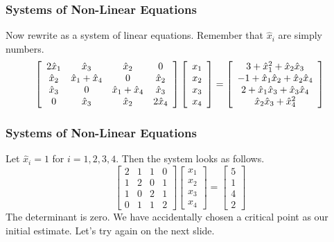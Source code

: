 \documentclass[xcolor=dvipsnames]{beamer}
\begin{document}
\begin{frame}
  \frametitle{Systems of Non-Linear Equations}
  Now rewrite as a system of linear equations. Remember that
  $\hat{x}_{i}$ are simply numbers.
  \begin{equation}
    \label{eq:heawaiqu}
    \left[
      \begin{array}{cccc}
2\hat{x}_{1} & \hat{x}_{3}       & \hat{x}_{2}       & 0     \\
\hat{x}_{2}  & \hat{x}_{1}+\hat{x}_{4} & 0           & \hat{x}_{2} \\
\hat{x}_{3}  & 0           & \hat{x}_{1}+\hat{x}_{4} & \hat{x}_{3} \\
0      & \hat{x}_{3}       & \hat{x}_{2}       & 2\hat{x}_{4}
      \end{array}\right]\left[
      \begin{array}{c}
        x_{1} \\
        x_{2} \\
        x_{3} \\
        x_{4}
      \end{array}\right]=\left[
      \begin{array}{c}
        3+\hat{x}_{1}^{2}+\hat{x}_{2}\hat{x}_{3} \\
        -1+\hat{x}_{1}\hat{x}_{2}+\hat{x}_{2}\hat{x}_{4} \\
        2+\hat{x}_{1}\hat{x}_{3}+\hat{x}_{3}\hat{x}_{4} \\
        \hat{x}_{2}\hat{x}_{3}+\hat{x}_{4}^{2}
      \end{array}\right]\notag
  \end{equation}
\end{frame}

\begin{frame}
  \frametitle{Systems of Non-Linear Equations}
  Let $\hat{x}_{i}=1$ for $i=1,2,3,4$. Then the system looks as
  follows.
  \begin{equation}
    \label{eq:zohfetie}
    \left[
      \begin{array}{cccc}
        2&1&1&0 \\
         1&2&0&1 \\
         1&0&2&1 \\
         0&1&1&2
      \end{array}\right]\left[
      \begin{array}{c}
        x_{1} \\
        x_{2} \\
        x_{3} \\
        x_{4}
      \end{array}\right]=\left[
      \begin{array}{c}
        5 \\
        1 \\
        4 \\
        2
      \end{array}\right]
  \end{equation}
The determinant is zero. We have accidentally chosen a critical point
as our initial estimate. Let's try again on the next slide.
\end{frame}
\end{document}
